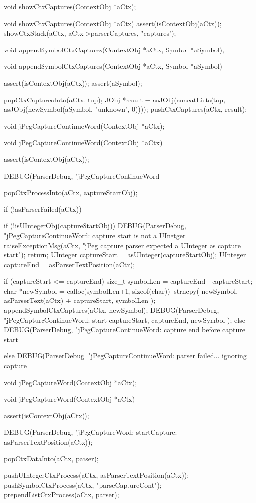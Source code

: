 \startCHeader
void showCtxCaptures(ContextObj *aCtx);
\stopCHeader

\startCCode
void showCtxCaptures(ContextObj *aCtx) {
  assert(isContextObj(aCtx));
  showCtxStack(aCtx, aCtx->parserCaptures, "captures");
}
\stopCCode

\startCHeader
void appendSymbolCtxCaptures(ContextObj *aCtx, Symbol *aSymbol);
\stopCHeader

\startCCode
void appendSymbolCtxCaptures(ContextObj *aCtx, Symbol *aSymbol) {
  assert(isContextObj(aCtx));
  assert(aSymbol);
  
  popCtxCapturesInto(aCtx, top);
  JObj *result =
    asJObj(concatLists(top,
      asJObj(newSymbol(aSymbol, "unknown", 0))));
  pushCtxCaptures(aCtx, result);
}
\stopCCode

\startCHeader
void jPegCaptureContinueWord(ContextObj *aCtx);
\stopCHeader

\startCCode
void jPegCaptureContinueWord(ContextObj *aCtx){
  assert(isContextObj(aCtx));
  
  DEBUG(ParserDebug, "jPegCaptureContinueWord%
  
  popCtxProcessInto(aCtx, captureStartObj);
  
  if (!asParserFailed(aCtx)) {
    if (!isUIntegerObj(captureStartObj)) {
      DEBUG(ParserDebug,
        "jPegCaptureContinueWord: capture start is not a UInetger%
      raiseExceptionMsg(aCtx,
        "jPeg capture parser expected a UInteger as capture start");
      return;
    }
    UInteger captureStart = asUInteger(captureStartObj);
    UInteger captureEnd   = asParserTextPosition(aCtx);
    
    if (captureStart <= captureEnd) {
      size_t symbolLen = captureEnd - captureStart;
      char *newSymbol = calloc(symbolLen+1, sizeof(char));
      strncpy(
        newSymbol,
        asParserText(aCtx) + captureStart,
        symbolLen
      );
      appendSymbolCtxCaptures(aCtx, newSymbol);
      DEBUG(ParserDebug,
        "jPegCaptureContinueWord: start %
        captureStart, captureEnd, newSymbol
      );
    } else {
      DEBUG(ParserDebug,
        "jPegCaptureContinueWord: capture end before capture start%
    }
  } else {
    DEBUG(ParserDebug,
      "jPegCaptureContinueWord: parser failed... ignoring capture%
  }
  
}
\stopCCode

\startCHeader
void jPegCaptureWord(ContextObj *aCtx);
\stopCHeader

\startCCode
void jPegCaptureWord(ContextObj *aCtx){
  assert(isContextObj(aCtx));
  
  DEBUG(ParserDebug, "jPegCaptureWord: startCapture: %
    asParserTextPosition(aCtx));

  popCtxDataInto(aCtx, parser);
    
  pushUIntegerCtxProcess(aCtx, asParserTextPosition(aCtx));
  pushSymbolCtxProcess(aCtx, "parseCaptureCont");
  prependListCtxProcess(aCtx, parser);
}
\stopCCode